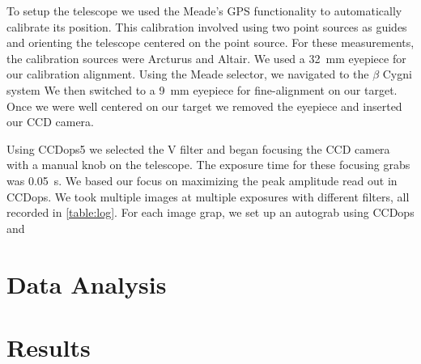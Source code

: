 \documentclass[%
aip,
jmp,
reprint,
]{revtex4-1}
\begin{document}
	To setup the telescope we used the Meade's GPS functionality to automatically calibrate its position. This calibration involved using two point sources as guides and orienting the telescope centered on the point source. For these measurements, the calibration sources were Arcturus and Altair. We used a \SI{32}{\milli\meter} eyepiece for our calibration alignment. Using the Meade selector, we navigated to the $\beta$ Cygni system We then switched to a \SI{9}{\milli\meter} eyepiece for fine-alignment on our target. Once we were well centered on our target we removed the eyepiece and inserted our CCD camera.
	
	Using CCDops5 we selected the V filter and began focusing the CCD camera with a manual knob on the telescope. The exposure time for these focusing grabs was \SI{0.05}{\second}. We based our focus on maximizing the peak amplitude read out in CCDops. We took multiple images at multiple exposures with different filters, all recorded in \autoref{table:log}. For each image grap, we set up an autograb using CCDops and 

	\section{Data Analysis}
	


	
	\section{Results}
	 
	
	
\end{document}
